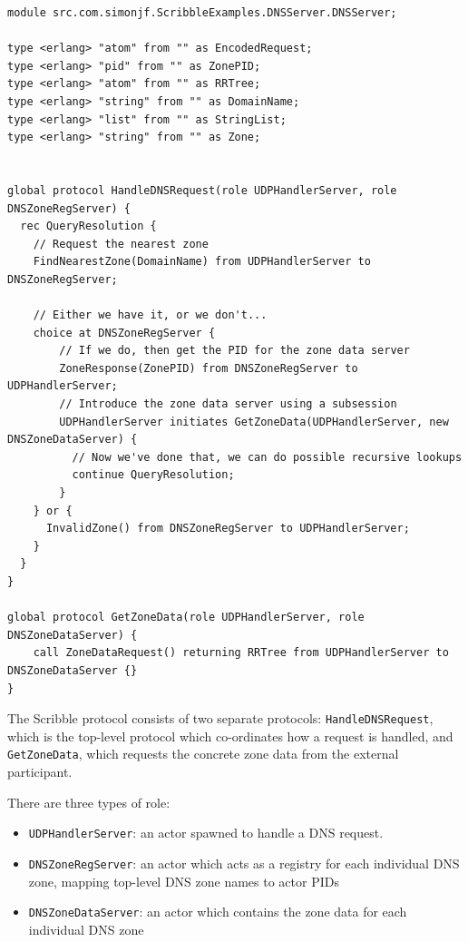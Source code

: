 \documentclass[a4paper]{article}
\begin{document}
\begin{minipage}{\linewidth}
\begin{lstlisting}[language=scribble]
module src.com.simonjf.ScribbleExamples.DNSServer.DNSServer;

type <erlang> "atom" from "" as EncodedRequest;
type <erlang> "pid" from "" as ZonePID;
type <erlang> "atom" from "" as RRTree;
type <erlang> "string" from "" as DomainName;
type <erlang> "list" from "" as StringList;
type <erlang> "string" from "" as Zone;


global protocol HandleDNSRequest(role UDPHandlerServer, role DNSZoneRegServer) {
  rec QueryResolution {
    // Request the nearest zone
    FindNearestZone(DomainName) from UDPHandlerServer to DNSZoneRegServer;

    // Either we have it, or we don't...
    choice at DNSZoneRegServer {
        // If we do, then get the PID for the zone data server
        ZoneResponse(ZonePID) from DNSZoneRegServer to UDPHandlerServer;
        // Introduce the zone data server using a subsession
        UDPHandlerServer initiates GetZoneData(UDPHandlerServer, new DNSZoneDataServer) {
          // Now we've done that, we can do possible recursive lookups
          continue QueryResolution;
        }
    } or {
      InvalidZone() from DNSZoneRegServer to UDPHandlerServer;
    }
  }
}

global protocol GetZoneData(role UDPHandlerServer, role DNSZoneDataServer) {
    call ZoneDataRequest() returning RRTree from UDPHandlerServer to DNSZoneDataServer {}
}
\end{lstlisting}
\end{minipage}

The Scribble protocol consists of two separate protocols: \texttt{HandleDNSRequest}, which is the top-level protocol which co-ordinates how a request is handled, and \texttt{GetZoneData}, which requests the concrete zone data from the external participant.

There are three types of role:

\begin{itemize}
\item \texttt{UDPHandlerServer}: an actor spawned to handle a DNS request.
\item \texttt{DNSZoneRegServer}: an actor which acts as a registry for each individual DNS zone, mapping top-level DNS zone names to actor PIDs
\item \texttt{DNSZoneDataServer}: an actor which contains the zone data for each individual DNS zone
\end{itemize}
\end{document}
